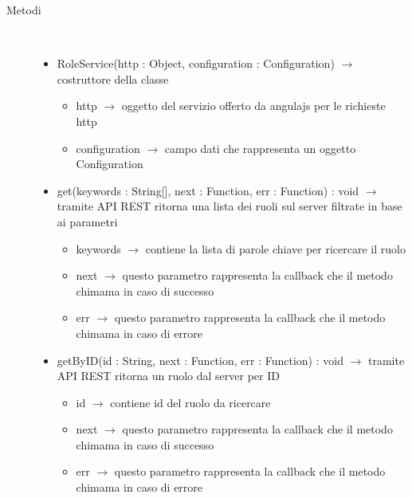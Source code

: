 \begin{description}
\item[Metodi] \hfill \\
\vspace{-7mm}
\begin{itemize}
	\item RoleService(http : Object, configuration : Configuration) $\rightarrow$ costruttore della classe\begin{itemize}
		\item http $\rightarrow$ oggetto del servizio offerto da angulajs per le richieste http
		\item configuration $\rightarrow$ campo dati che rappresenta un oggetto Configuration
	\end{itemize}
	
	\item get(keywords : String[], next : Function, err : Function) : void $\rightarrow$ tramite API REST ritorna una lista dei ruoli sul server filtrate in base ai parametri\begin{itemize}
		\item keywords $\rightarrow$ contiene la lista di parole chiave per ricercare il ruolo
		\item next $\rightarrow$ questo parametro rappresenta la callback che il metodo chimama in caso di successo
		\item err $\rightarrow$ questo parametro rappresenta la callback che il metodo chimama in caso di errore
	\end{itemize}
	
	\item getByID(id : String, next : Function, err : Function) : void $\rightarrow$ tramite API REST ritorna un ruolo dal server per ID\begin{itemize}
		\item id $\rightarrow$ contiene id del ruolo da ricercare
		\item next $\rightarrow$ questo parametro rappresenta la callback che il metodo chimama in caso di successo
		\item err $\rightarrow$ questo parametro rappresenta la callback che il metodo chimama in caso di errore
	\end{itemize}
	
\end{itemize}

\end{description}


